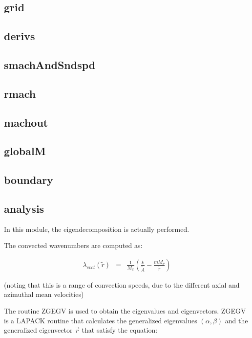 \documentclass[12pt]{article}
\begin{document}
\subsection{grid}

\subsection{derivs}

\subsection{smachAndSndspd}

\subsection{rmach}

\subsection{machout}

\subsection{globalM}

\subsection{boundary}

\subsection{analysis}

In this module, the eigendecomposition is actually performed.

The convected wavenumbers are computed as:

\begin{eqnarray}
\lambda_{cvct} \left(\widetilde{r} \right) &=& 
\frac{1}{M_x} 
\left(\frac{k}{\widetilde{A}} - \frac{m M_{\theta}}{\widetilde{r}} \right)
\nonumber
\end{eqnarray}

(noting that this is a range of convection speeds, due to the different
axial and azimuthal mean velocities)

The routine ZGEGV is used to obtain the eigenvalues and eigenvectors.
ZGEGV is a LAPACK routine that calculates the generalized eigenvalues
$\left(\alpha, \beta \right)$ and the generalized eigenvector $\vec{r}$
that satisfy the equation:
\end{document}
